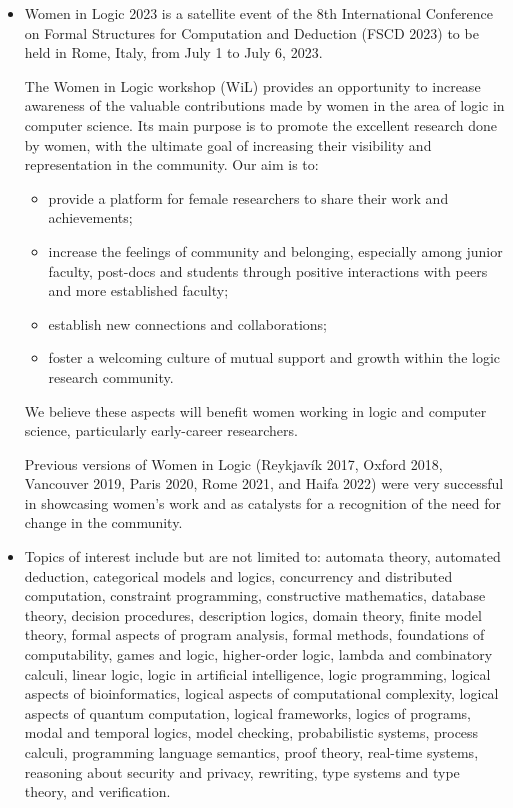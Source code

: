 \documentclass[prodmode,acmtecs]{acmsmall} %
\begin{document}
\begin{itemize}\item  Women in Logic 2023 is a satellite event of the  8th International Conference on Formal Structures for Computation and Deduction (FSCD 2023) to be held in Rome, Italy, from July 1 to July 6, 2023. 
 
  The Women in Logic workshop (WiL) provides an opportunity to increase awareness of the valuable contributions made by women in the area of logic in computer science. Its main purpose is to promote the excellent research done by women, with the ultimate goal of increasing their visibility and representation in the community. Our aim is to: 
 
\begin{itemize}\item  provide a platform for female researchers to share their work and achievements;
\item  increase the feelings of community and belonging, especially among junior faculty, post-docs and students through positive interactions with peers and more established faculty;
\item  establish new connections and collaborations;
\item  foster a welcoming culture of mutual support and growth within the logic research community.
\end{itemize} 
  We believe these aspects will benefit women working in logic and computer science, particularly early-career researchers. 
 
  Previous versions of Women in Logic (Reykjavík 2017, Oxford 2018, Vancouver 2019, Paris 2020, Rome 2021, and Haifa 2022) were very successful in showcasing women's work and as catalysts for a recognition of the need for change in the community. 
 
\item  Topics of interest include but are not limited to: automata theory, automated deduction, categorical models and logics, concurrency and distributed computation, constraint programming, constructive mathematics, database theory, decision procedures, description logics, domain theory, finite model theory, formal aspects of program analysis, formal methods, foundations of computability, games and logic, higher-order logic, lambda and combinatory calculi, linear logic, logic in artificial intelligence, logic programming, logical aspects of bioinformatics, logical aspects of computational complexity, logical aspects of quantum computation, logical frameworks, logics of programs, modal and temporal logics, model checking, probabilistic systems, process calculi, programming language semantics, proof theory, real-time systems, reasoning about security and privacy, rewriting, type systems and type theory, and verification. 
 

\end{itemize}
\end{document}

